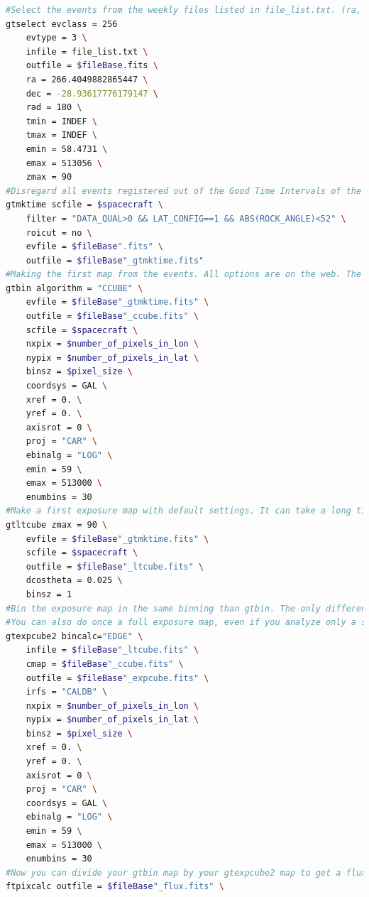 \begin{lstlisting}[language=bash,caption={Bash script details for the treatment of the Fermi LAT data.},label={app:script}, breaklines=true]
#Select the events from the weekly files listed in file_list.txt. (ra, dec) is the galactic center coordinates in ICRS system, a radius of 180 to select the whole sky, and the energy bounds. The one here correspond to the energy bound of the Fermi diffuse model. You might run into troubles later if you try to use it with energies out of this range
gtselect evclass = 256 
	evtype = 3 \
	infile = file_list.txt \
	outfile = $fileBase.fits \
	ra = 266.4049882865447 \
	dec = -28.93617776179147 \
	rad = 180 \
	tmin = INDEF \
	tmax = INDEF \
	emin = 58.4731 \
	emax = 513056 \
	zmax = 90
#Disregard all events registered out of the Good Time Intervals of the spacecraft, with the cut recommended by Fermi peoples
gtmktime scfile = $spacecraft \
	filter = "DATA_QUAL>0 && LAT_CONFIG==1 && ABS(ROCK_ANGLE)<52" \
	roicut = no \
	evfile = $fileBase".fits" \
	outfile = $fileBase"_gtmktime.fits"
#Making the first map from the events. All options are on the web. The settings of this map are reused later for the exposure for example.
gtbin algorithm = "CCUBE" \
	evfile = $fileBase"_gtmktime.fits" \
	outfile = $fileBase"_ccube.fits" \
	scfile = $spacecraft \
	nxpix = $number_of_pixels_in_lon \
	nypix = $number_of_pixels_in_lat \
	binsz = $pixel_size \
	coordsys = GAL \
	xref = 0. \
	yref = 0. \
	axisrot = 0 \
	proj = "CAR" \
	ebinalg = "LOG" \
	emin = 59 \
	emax = 513000 \
	enumbins = 30
#Make a first exposure map with default settings. It can take a long time. Here the zmax=90 is to avoid the earth limbs contamination.
gtltcube zmax = 90 \
	evfile = $fileBase"_gtmktime.fits" \
	scfile = $spacecraft \
	outfile = $fileBase"_ltcube.fits" \
	dcostheta = 0.025 \
	binsz = 1
#Bin the exposure map in the same binning than gtbin. The only difference is for the energy bins: It creates a map for every energy bin's "EDGE" when gtbin creates a map for every energy bin's "CENTER". This can be changed via "bincalc" option but you need to let it on edge for later.
#You can also do once a full exposure map, even if you analyze only a small sky region, if you don't change the cuts in gtselect you can then reuse it.
gtexpcube2 bincalc="EDGE" \
	infile = $fileBase"_ltcube.fits" \
	cmap = $fileBase"_ccube.fits" \
	outfile = $fileBase"_expcube.fits" \
	irfs = "CALDB" \
	nxpix = $number_of_pixels_in_lon \
	nypix = $number_of_pixels_in_lat \
	binsz = $pixel_size \
	xref = 0. \
	yref = 0. \
	axisrot = 0 \
	proj = "CAR" \
	coordsys = GAL \
	ebinalg = "LOG" \
	emin = 59 \
	emax = 513000 \
	enumbins = 30
#Now you can divide your gtbin map by your gtexpcube2 map to get a flux map! Use this:
ftpixcalc outfile = $fileBase"_flux.fits" \

\end{lstlisting}
